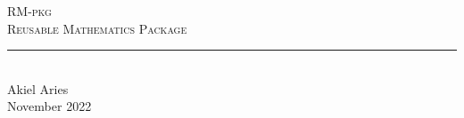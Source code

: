 \documentclass[12pt, letterpaper]{article}
\begin{document}
\newcommand{\papertitle}{Akiel Aries}
\newcommand{\papermajorheading}{RM-pkg}
\newcommand{\paperminorheading}{Reusable Mathematics Package}

\newcommand{\HRule}{\rule{\linewidth}{0.5mm}} %

\center %


\textsc{\Large \papermajorheading}\\[0.2cm] %
\textsc{\large \paperminorheading}\\[0.75cm] %


\HRule \\[0.4cm]
{ \papertitle}\\[0.1cm] %




{\large November 2022} \linebreak
\end{document}
